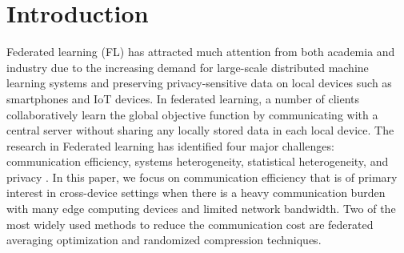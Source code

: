 \section{Introduction}

Federated learning (FL) has attracted much attention from both academia and industry due to the increasing demand for large-scale distributed machine learning systems and preserving privacy-sensitive data on local devices such as smartphones and IoT devices. In federated learning, a number of clients collaboratively learn the global objective function by communicating with a central server without sharing any locally stored data in each local device. The research in Federated learning has identified four major challenges: communication efficiency, systems heterogeneity, statistical heterogeneity, and privacy \citep{li2020federated}. In this paper, we focus on communication efficiency that is of primary interest in cross-device settings when there is a heavy communication burden with many edge computing devices and limited network bandwidth. Two of the most widely used methods to reduce the communication cost are federated averaging optimization and randomized compression techniques.

